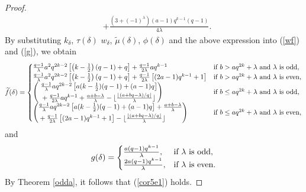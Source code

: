\documentclass[journal,onecolumn]{IEEEtran}
\begin{document}
\begin{proof}
\begin{equation}
\begin{split}
   & + \frac{(3+(-1)^{\lambda})(a-1)q^{k-1}(q-1)}{4\lambda}.
    \end{split}
\end{equation}
By substituting  $k_{\delta}$, $\tau(\delta)$ $w_{\delta}$, $\widetilde{\mu}(\delta)$, $\phi(\delta)$ and the above expression into (\ref{wf}) and (\ref{g}), we obtain   
\begin{equation}\notag
    \widetilde{f}(\delta)=\begin{cases}
        \frac{q-1}{\lambda}a^2q^{2k-2}\left[\left(k-\frac{1}{2}\right)(q-1)+q\right]+\frac{q-1}{2\lambda}aq^{k-1}& \hbox{if }  b> aq^{2k} + \lambda \hbox{ and }\lambda \hbox{ is odd},\\
        \frac{q-1}{\lambda}a^2q^{2k-2}\left[\left(k-\frac{1}{2}\right)(q-1)+q\right]+\frac{q-1}{2\lambda}\left[(2a-1)q^{k-1}+1\right]& \hbox{if }  b> aq^{2k} + \lambda \hbox{ and }\lambda \hbox{ is even},\\
{\left(\begin{aligned}
&\textstyle\frac{q-1}{\lambda}aq^{2k-2}   \left[a(k-\textstyle\frac{1}{2})(q-1)+(a-1)q\right] \\\
&+ \textstyle\frac{q-1}{2\lambda}aq^{k-1}+\frac{a+b-\lambda}{\lambda}- \lfloor\textstyle \frac{\lfloor(a+bq-\lambda)/q\rfloor}{\lambda} \rfloor\end{aligned}\right)}
&\hbox{if } b\leq  aq^{2k}+\lambda
   \hbox{ and } \lambda \hbox{ is odd,} \\
{\left(\begin{aligned}
&\textstyle\frac{q-1}{\lambda}aq^{2k-2}   \left[a(k-\textstyle\frac{1}{2})(q-1)+(a-1)q\right]+\textstyle\frac{a+b-\lambda}{\lambda}\\
&+\textstyle\frac{q-1}{2\lambda}\left[(2a-1)q^{k-1}+1\right]- \lfloor \textstyle\frac{\lfloor(a+bq-\lambda)/q\rfloor}{\lambda} \rfloor\end{aligned}\right)}
&\hbox{if } b\leq  aq^{2k}+\lambda
   \hbox{ and } \lambda \hbox{ is even,}   \end{cases}
\end{equation}
and 
\begin{equation}\notag
    g(\delta)=\begin{cases} 
    \frac{a(q-1)q^{k-1}}{\lambda},& \hbox{if $\lambda$ is odd,}\\
    \frac{2a(q-1)q^{k-1}}{\lambda},& \hbox{if $\lambda$ is even.}
    \end{cases}
\end{equation}
By Theorem \ref{odda}, it follows that (\ref{cor5e1}) holds. 
\end{proof}
\end{document}
